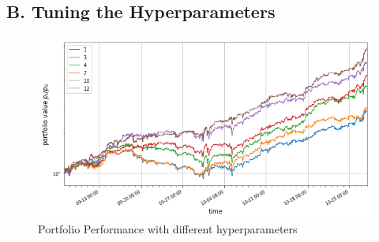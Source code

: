 \documentclass[11pt]{paper}
\begin{document}
	\subsection*{B. Tuning the Hyperparameters}
			\begin{figure}[h]%
			\centering  
			\includegraphics[width=1\linewidth]{tune.png} 
			\caption{Portfolio Performance with different hyperparameters} 

		\end{figure}
\end{document}
